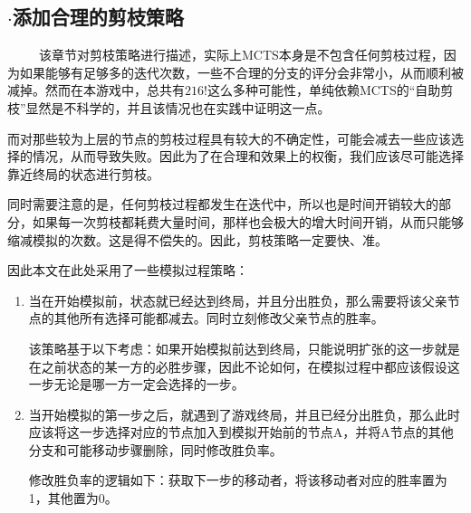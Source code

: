 \documentclass[9pt,twocolumn,twoside]{osajnl}
\begin{document}
\subsection{$\cdot$添加合理的剪枝策略}
\begin{adjustwidth}{2em}{}	
	\ \ \ \ \
	该章节对剪枝策略进行描述，实际上MCTS本身是不包含任何剪枝过程，因为如果能够有足够多的迭代次数，一些不合理的分支的评分会非常小，从而顺利被减掉。然而在本游戏中，总共有$216!$这么多种可能性，单纯依赖MCTS的“自助剪枝”显然是不科学的，并且该情况也在实践中证明这一点。

	而对那些较为上层的节点的剪枝过程具有较大的不确定性，可能会减去一些应该选择的情况，从而导致失败。因此为了在合理和效果上的权衡，我们应该尽可能选择靠近终局的状态进行剪枝。
	
	同时需要注意的是，任何剪枝过程都发生在迭代中，所以也是时间开销较大的部分，如果每一次剪枝都耗费大量时间，那样也会极大的增大时间开销，从而只能够缩减模拟的次数。这是得不偿失的。因此，剪枝策略一定要快、准。
	
	因此本文在此处采用了一些模拟过程策略：
	\begin{enumerate}
		\item 当在开始模拟前，状态就已经达到终局，并且分出胜负，那么需要将该父亲节点的其他所有选择可能都减去。同时立刻修改父亲节点的胜率。
		
		该策略基于以下考虑：如果开始模拟前达到终局，只能说明扩张的这一步就是在之前状态的某一方的必胜步骤，因此不论如何，在模拟过程中都应该假设这一步无论是哪一方一定会选择的一步。
		
		\item 当开始模拟的第一步之后，就遇到了游戏终局，并且已经分出胜负，那么此时应该将这一步选择对应的节点加入到模拟开始前的节点A，并将A节点的其他分支和可能移动步骤删除，同时修改胜负率。
		
		修改胜负率的逻辑如下：获取下一步的移动者，将该移动者对应的胜率置为1，其他置为0。
	\end{enumerate}
	

\end{adjustwidth}
\end{document}
